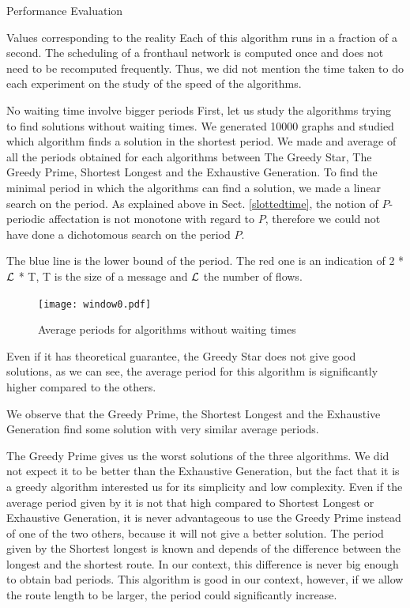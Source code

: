 \documentclass[a4paper,10pt]{report}
\begin{document}
\begin{chapter}{Performance Evaluation}
\begin{section}{Values corresponding to the reality}
Each of this algorithm runs in a fraction of a second. The scheduling of a fronthaul network is computed once and does not 
need to be recomputed frequently. Thus, we did not mention the time taken to do each experiment on the study of the speed of the algorithms.
\end{section}

\begin{section}{No waiting time involve bigger periods}
First, let us study the algorithms trying to find solutions without waiting times.
We generated 10000 graphs and studied which algorithm finds a solution in the shortest period. We made and average of all the periods obtained for each algorithms
between The Greedy Star, The Greedy Prime, Shortest Longest and the Exhaustive Generation.
To find the minimal period in which the algorithms can find a solution, we made a linear search on the period. As explained above in Sect. \ref{slottedtime}, the notion of $P$-periodic affectation is not monotone with regard to $P$,  therefore we could not have done a dichotomous search on the period $P$.

The blue line is the lower bound of the period. The red one is an indication of 2 * ${\cal L}$ * T, T is the size of a message and ${\cal L}$ the number of flows.
\begin{figure}[H]
\hspace*{-3cm}
\centering
\texttt{[image: window0.pdf]}%
\caption{Average periods for algorithms without waiting times}
\end{figure}


Even if it has theoretical guarantee, the Greedy Star does not give good solutions, as we can see, the average period for this algorithm is 
significantly higher compared to the others.

We observe that the Greedy Prime, the Shortest Longest and the Exhaustive Generation find some solution with very similar average periods.

The Greedy Prime gives us the worst solutions of the three algorithms. We did not expect it to be better than the Exhaustive Generation, but the fact that it is a greedy algorithm interested us for its simplicity and low complexity.
Even if the average period given by it is not that high compared to Shortest Longest or Exhaustive Generation, it is never advantageous to use the Greedy Prime instead of one of the two others, because it will not give a better solution.
The period given by the Shortest longest is known and depends of the difference between the longest and the shortest route.
In our context, this difference is never big enough to obtain bad periods. This algorithm is good in our context, however, if we allow the 
route length to be larger, the period could significantly increase.


\end{section}
\end{chapter}
\end{document}
